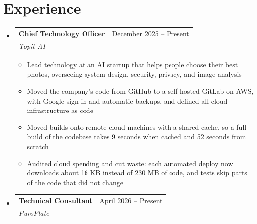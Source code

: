 \documentclass[letterpaper,11pt]{article}
\makeatletter
\newcommand{\resumeItem}[1]{
  \item\small{
    {#1 \vspace{-2pt}}
  }
}
\newcommand{\resumeSubheading}[4]{
  \vspace{-2pt}\item
    \begin{tabular*}{0.97\textwidth}[t]{l@{\extracolsep{\fill}}r}
      \textbf{#1} & #2 \\
      \textit{\small#3} & \textit{\small #4} \\
    \end{tabular*}\vspace{-7pt}
}
\newcommand{\resumeSubHeadingListStart}{\begin{itemize}[leftmargin=0.15in, label={}]}
\newcommand{\resumeSubHeadingListEnd}{\end{itemize}}
\newcommand{\resumeItemListStart}{\begin{itemize}}
\newcommand{\resumeItemListEnd}{\end{itemize}\vspace{-5pt}}
\makeatother
\begin{document}
\section{Experience}
  \resumeSubHeadingListStart

    \resumeSubheading
      {Chief Technology Officer}{December 2025 -- Present}
      {Topit AI}{}
      \resumeItemListStart
        \resumeItem{Lead technology at an AI startup that helps people choose their best photos, overseeing system design, security, privacy, and image analysis}
        \resumeItem{Moved the company's code from GitHub to a self-hosted GitLab on AWS, with Google sign-in and automatic backups, and defined all cloud infrastructure as code}
        \resumeItem{Moved builds onto remote cloud machines with a shared cache, so a full build of the codebase takes 9 seconds when cached and 52 seconds from scratch}
        \resumeItem{Audited cloud spending and cut waste: each automated deploy now downloads about 16 KB instead of 230 MB of code, and tests skip parts of the code that did not change}
      \resumeItemListEnd

    \resumeSubheading
      {Technical Consultant}{April 2026 -- Present}
      {PuroPlate}{}

  \resumeSubHeadingListEnd


\end{document}
